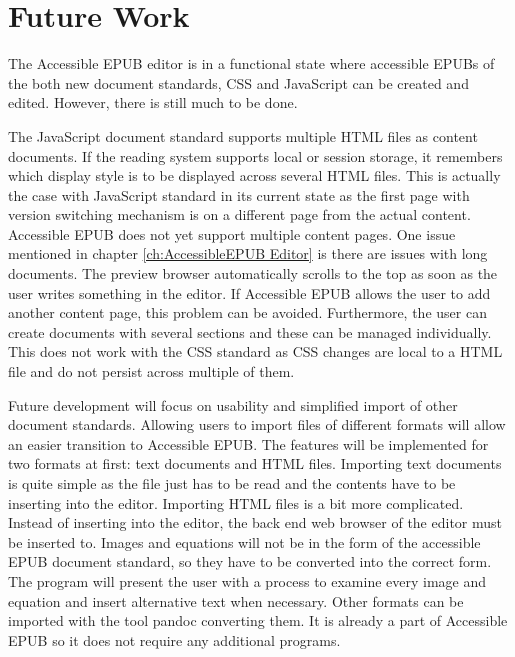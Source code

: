 
\chapter{Future Work}
\label{ch:FutureWork}
%
The Accessible EPUB editor is in a functional state where accessible EPUBs of the both new document standards, CSS and JavaScript can be created and edited. However, there is still much to be done.

The JavaScript document standard supports multiple HTML files as content documents. If the reading system supports local or session storage, it remembers which display style is to be displayed across several HTML files. This is actually the case with JavaScript standard in its current state as the first page with version switching mechanism is on a different page from the actual content. Accessible EPUB does not yet support multiple content pages. One issue mentioned in chapter \ref{ch:AccessibleEPUB Editor} is there are issues with long documents. The preview browser automatically scrolls to the top as soon as the user writes something in the editor. If Accessible EPUB allows the user to add another content page, this problem can be avoided. Furthermore, the user can create documents with several sections and these can be managed individually. This does not work with the CSS standard as CSS changes are local to a HTML file and do not persist across multiple of them.

Future development will focus on usability and simplified import of other document standards. Allowing users to import files of different formats will allow an easier transition to Accessible EPUB. The features will be implemented for two formats at first: text documents and HTML files. Importing text documents is quite simple as the file just has to be read and the contents have to be inserting into the editor. Importing HTML files is a bit more complicated. Instead of inserting into the editor, the back end web browser of the editor must be inserted to. Images and equations will not be in the form of the accessible EPUB document standard, so they have to be converted into the correct form. The program will present the user with a process to examine every image and equation and insert alternative text when necessary. Other formats can be imported with the tool pandoc converting them. It is already a part of Accessible EPUB so it does not require any additional programs.

